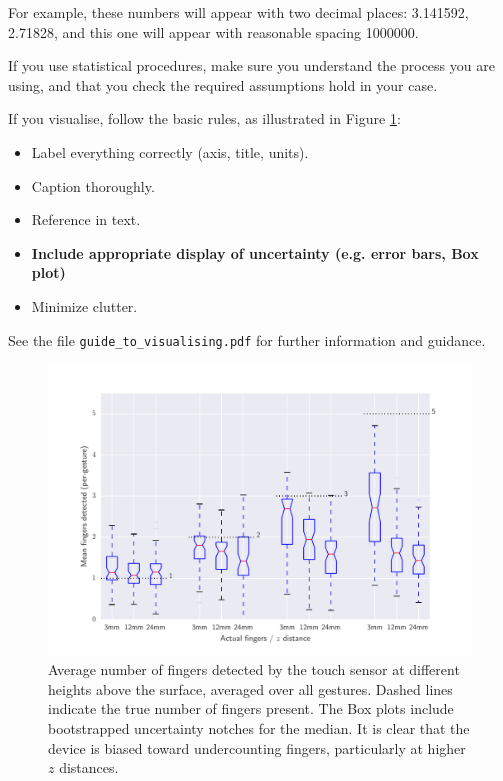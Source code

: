 \documentclass{l4proj}
\begin{document}

For example, these numbers will appear with two decimal places: \num{3.141592}, \num{2.71828}, and this one will appear with reasonable spacing \num{1000000}.



If you use statistical procedures, make sure you understand the process you are using,
and that you check the required assumptions hold in your case.

If you visualise, follow the basic rules, as illustrated in Figure \ref{fig:boxplot}:
\begin{itemize}
      \item Label everything correctly (axis, title, units).
      \item Caption thoroughly.
      \item Reference in text.
      \item \textbf{Include appropriate display of uncertainty (e.g. error bars, Box plot)}
      \item Minimize clutter.
\end{itemize}

See the file \texttt{guide\_to\_visualising.pdf} for further information and guidance.

\begin{figure}[htb]
      \centering
      \includegraphics[width=1.0\linewidth]{images/boxplot_finger_distance.pdf}

      \caption{Average number of fingers detected by the touch sensor at different heights above the surface, averaged over all gestures. Dashed lines indicate
            the true number of fingers present. The Box plots include bootstrapped uncertainty notches for the median. It is clear that the device is biased toward
            undercounting fingers, particularly at higher $z$ distances.
      }

      \label{fig:boxplot}
\end{figure}
\end{document}
